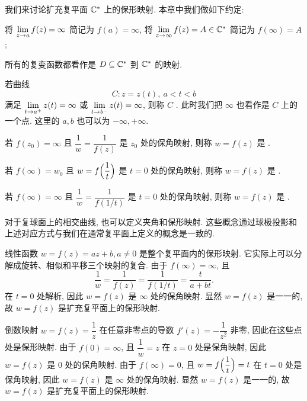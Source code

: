 我们来讨论扩充复平面 ${\mathbb{C}}^*$ 上的保形映射.
本章中我们做如下约定:
\begin{marker}
  \begin{enuma}
    \item 将 $\lim\limits_{z\rightarrow a}f(z)=\infty$ 简记为 $f(a)=\infty$, 将 $\lim\limits_{z\rightarrow \infty}f(z)=A\in{\mathbb{C}}^*$ 简记为 $f(\infty)=A$;
    \item 所有的复变函数都看作是 $D\subseteq{\mathbb{C}}^*$ 到 ${\mathbb{C}}^*$ 的映射.
  \end{enuma}
\end{marker}

若曲线
\[
  C: z=z(t),\ a<t<b
\]
满足 $\lim\limits_{t\rightarrow a^+}z(t)=\infty$ 或 $\lim\limits_{t\rightarrow b^-}z(t)=\infty$, 则称 $C$ .
此时我们把 $\infty$ 也看作是 $C$ 上的一个点.
这里的 $a,b$ 也可以为 $-\infty,+\infty$.

\begin{definition}
  \begin{enuma}
    \item 若 $f(z_0)=\infty$ 且 $\dfrac1w=\dfrac1{f(z)}$ 是 $z_0$ 处的保角映射, 则称 $w=f(z)$ 是 .
    \item 若 $f(\infty)=w_0$ 且 $w=f\Bigl(\dfrac1t\Bigr)$ 是 $t=0$ 处的保角映射, 则称 $w=f(z)$ 是 .
    \item 若 $f(\infty)=\infty$ 且 $\dfrac1w=\dfrac1{f(1/t)}$ 是 $t=0$ 处的保角映射, 则称 $w=f(z)$ 是 .
  \end{enuma}
\end{definition}

对于复球面上的相交曲线, 也可以定义夹角和保形映射.
这些概念通过球极投影和上述对应方式与我们在通常复平面上定义的概念是一致的.

\begin{example}
  \label{exam:linear-transform}
  线性函数 $w=f(z)=az+b,a\neq 0$ 是整个复平面内的保形映射.
  它实际上可以分解成旋转、相似和平移三个映射的复合.
  由于 $f(\infty)=\infty$, 且
  \[
    \dfrac1w=\dfrac1{f(z)}=\dfrac1{f(1/t)}=\dfrac{t}{a+bt}.
  \]
  在 $t=0$ 处解析, 因此 $w=f(z)$ 是 $\infty$ 处的保角映射.
  显然 $w=f(z)$ 是一一的, 故 $w=f(z)$ 是扩充复平面上的保形映射.
\end{example}

\begin{example}
  \label{exam:inverse-transform}
  倒数映射 $w=f(z)=\dfrac1z$ 在任意非零点的导数 $f'(z)=-\dfrac1{z^2}$ 非零, 因此在这些点处是保形映射.
  由于 $f(0)=\infty$, 且 $\dfrac1w=z$ 在 $z=0$ 处是保角映射, 因此 $w=f(z)$ 是 $0$ 处的保角映射.
  由于 $f(\infty)=0$, 且 $w=f\Bigl(\dfrac1t\Bigr)=t$ 在 $t=0$ 处是保角映射, 因此 $w=f(z)$ 是 $\infty$ 处的保角映射.
  显然 $w=f(z)$ 是一一的, 故 $w=f(z)$ 是扩充复平面上的保形映射.
\end{example}

